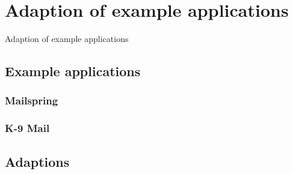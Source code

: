 \chapter{Adaption of example applications}
\label{ch:adaption}


Adaption of example applications

\section{Example applications}

\subsection{Mailspring}

\subsection{K-9 Mail}

\section{Adaptions}

